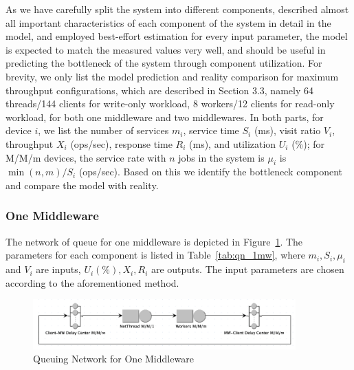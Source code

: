 As we have carefully split the system into different components, described almost all important characteristics of each component of the system in detail in the model, and employed best-effort estimation for every input parameter, the model is expected to match the measured values very well, and should be useful in predicting the bottleneck of the system through component utilization. For brevity, we only list the model prediction and reality comparison for maximum throughput configurations, which are described in Section 3.3, namely 64 threads/144 clients for write-only workload, 8 workers/12 clients for read-only workload, for both one middleware and two middlewares. In both parts, for device $i$, we list the number of services $m_i$, service time $S_i$ (ms), visit ratio $V_i$, throughput $X_i$ (ops/sec), response time $R_i$ (ms), and utilization $U_i$ (\%); for M/M/m devices, the service rate with $n$ jobs in the system is $\mu_i$ is $\min(n, m)/S_i$ (ops/sec). Based on this we identify the bottleneck component and compare the model with reality.

\subsubsection{One Middleware}

The network of queue for one middleware is depicted in Figure~\ref{fig:qn_1mw}. The parameters for each component is listed in Table~\ref{tab:qn_1mw}, where $m_i, S_i, \mu_i$ and $V_i$ are inputs, $U_i (\%), X_i, R_i$  are outputs. The input parameters are chosen according to the aforementioned method.

\begin{figure}[!ht]
\centering
\includegraphics[width=0.9\textwidth]{img/7_qn_1mw.png}
\captionsetup{justification=centering}
\caption{\label{fig:qn_1mw}Queuing Network for One Middleware}
\end{figure}


